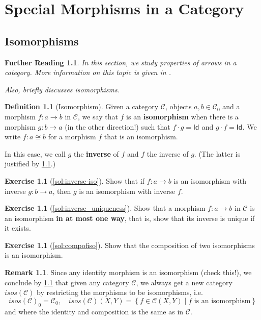 \documentclass[a4paper,11pt, oneside,titlepage=false]{scrbook}
\theoremstyle{plain}
\newtheorem*{reading*}{Further Reading}
\theoremstyle{definition}
\newtheorem{rem}[thm]{Remark}
\newtheorem{dfn}[thm]{Definition}
\newtheorem{exer}[thm]{Exercise}
\newcommand{\cfont}[1]{\ensuremath{\mathsf{#1}}}
\newcommand{\Cat}[1]{\mathcal{#1}}
\newcommand{\CC}{\Cat{C}}
\newcommand{\Ob}[1]{{#1}_0}
\newcommand{\CHom}[3]{{#1}(#2,#3)}
\newcommand{\Id}[1][]{\cfont{Id}_{#1}}
\newcommand{\Comp}{\cdot}
\begin{document}
\chapter{Special Morphisms in a Category}

\section{Isomorphisms}
\label{sec:isos}

\begin{reading*}
  In this section, we study properties of arrows in a category.
  More information on this topic is given in \cite[\S 2.7]{barr-wells}.

  Also, \cite[\S 2.2]{pierce} briefly discusses isomorphisms.
\end{reading*}


\begin{dfn}[Isomorphism]
  Given a category $\CC$, objects $a,b \in \Ob{\CC}$ and a morphism $f : a \to b$ in $\CC$, we say that $f$ is an \textbf{isomorphism} when there is a morphism $g : b \to a$ (in the other direction!) such that $f \Comp g = \Id$ and $g \Comp f = \Id$.
  We write $f : a \cong b$ for a morphism $f$ that is an isomorphism.

  In this case, we call $g$ the \textbf{inverse} of $f$ and $f$ the inverse of $g$. (The latter is justified by \cref{exer:inverse-iso}.)
\end{dfn}

\begin{exer}[\cref{sol:inverse-iso}]\label{exer:inverse-iso}
  Show that if $f : a \to b$ is an isomorphism with inverse $g : b \to a$, then $g$ is an isomorphism with inverse $f$.
\end{exer}

\begin{exer}[\cref{sol:inverse_uniqueness}]\label{exer:inverse_uniqueness}
  Show that a morphism $f : a \to b$ in $\CC$ is an isomorphism \textbf{in at most one way}, that is, show that its inverse is unique if it exists.
\end{exer}

\begin{exer}[\cref{sol:compofiso}]\label{exer:compofiso}
  Show that the composition of two isomorphisms is an isomorphism.
\end{exer}
\begin{rem} 
Since any identity morphism is an isomorphism (check this!), we conclude by \cref{exer:compofiso} that given any category $\CC$, we always get a new category $isos(\CC)$ by restricting the morphisms to be isomorphisms, i.e. \[
\Ob{isos(\CC)} = \Ob{\CC}, \quad \CHom{isos(\CC)}{X}{Y} = \left\{f \in \CHom{\CC}{X}{Y} \mid f \text{ is an isomorphism}\right\}
\] 
and where the identity and composition is the same as in $\CC$.
\end{rem}
\end{document}
